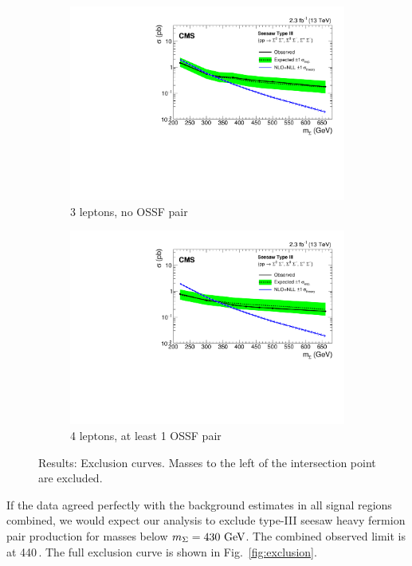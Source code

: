 \begin{figure}
\begin{center}
\begin{subfigure}[b]{.5\textwidth}
		\includegraphics[width=\textwidth]{Results/exclusion-L3DY0}
		\caption{3 leptons, no OSSF pair}
	\end{subfigure}%
	\begin{subfigure}[b]{.5\textwidth}
		\includegraphics[width=\textwidth]{Results/exclusion-L4DYgt0}
		\caption{4 leptons, at least 1 OSSF pair}
	\end{subfigure}%
	\caption{Results: Exclusion curves. Masses to the left of the intersection point are excluded.
	\label{fig:exclusions}}
\end{center}
\end{figure}

If the data agreed perfectly with the background estimates in all signal regions combined, we would expect our analysis to exclude type-III seesaw heavy fermion pair production for masses below $m_\Sigma = 430\,\,\text{Ge\hspace{-.08em}V}$. The combined observed limit is at 440\,\GeV. The full exclusion curve is shown in Fig.~\ref{fig:exclusion}.

